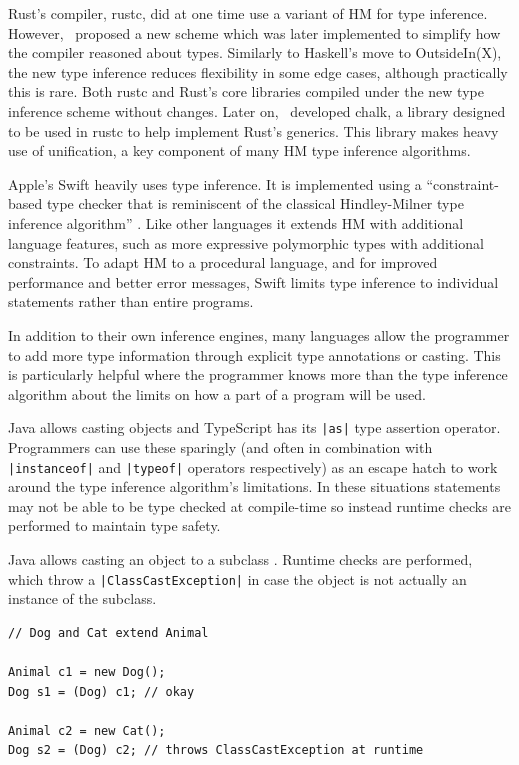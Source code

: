 \documentclass[a4paper,fleqn,12pt]{article}
\begin{document}
Rust’s compiler, rustc, did at one time use a variant of HM for type inference. However,~\cite{ref22} proposed a new scheme which was later implemented to simplify how the compiler reasoned about types. Similarly to Haskell’s move to OutsideIn(X), the new type inference reduces flexibility in some edge cases, although practically this is rare. Both rustc and Rust’s core libraries compiled under the new type inference scheme without changes. Later on,~\cite{ref23} developed chalk, a library designed to be used in rustc to help implement Rust’s generics. This library makes heavy use of unification, a key component of many HM type inference algorithms.

Apple’s Swift heavily uses type inference. It is implemented using a “constraint-based type checker that is reminiscent of the classical Hindley-Milner type inference algorithm” \citep{ref24}. Like other languages it extends HM with additional language features, such as more expressive polymorphic types with additional constraints. To adapt HM to a procedural language, and for improved performance and better error messages, Swift limits type inference to individual statements rather than entire programs.

In addition to their own inference engines, many languages allow the programmer to add more type information through explicit type annotations or casting. This is particularly helpful where the programmer knows more than the type inference algorithm about the limits on how a part of a program will be used.

Java allows casting objects and TypeScript has its \texttt{|as|} type assertion operator. Programmers can use these sparingly (and often in combination with \texttt{|instanceof|} and \texttt{|typeof|} operators respectively) as an escape hatch to work around the type inference algorithm’s limitations. In these situations statements may not be able to be type checked at compile-time so instead runtime checks are performed to maintain type safety.

Java allows casting an object to a subclass \citep{ref25}. Runtime checks are performed, which throw a \texttt{|ClassCastException|} in case the object is not actually an instance of the subclass.

\begin{verbatim}
// Dog and Cat extend Animal

Animal c1 = new Dog();
Dog s1 = (Dog) c1; // okay

Animal c2 = new Cat();
Dog s2 = (Dog) c2; // throws ClassCastException at runtime
\end{verbatim}
\end{document}
